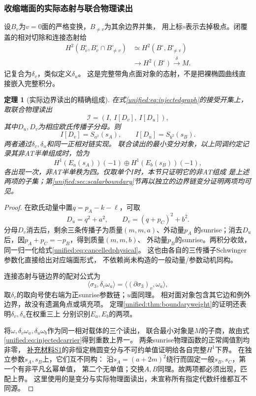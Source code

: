 \documentclass[11pt,a4paper,oneside]{ctexart}
\theoremstyle{cnplain}
\newtheorem{theorem}{定理}[section]
\theoremstyle{definition}
\theoremstyle{remark}
\numberwithin{equation}{section}
\newcommand{\otherref}[2]{\href{#1.pdf}{#2}}
\begin{document}
\subsubsection{收缩端面的实际态射与联合物理读出}
设$B_v$为$v=0$面的严格变换，$B_{\ne v}$为其余边界并集，
用上标$\circ$表示去掉极点。闭覆盖的相对切除和连接态射给
\begin{equation}\label{unified:eq:facemap}
\begin{split}
 H^2(B_v^\circ,B_v^\circ\cap B_{\ne v}^\circ)
 &\simeq H^2(B^\circ,B_{\ne v}^\circ)\\
 &\longrightarrow H^2(B^\circ)
 \overset\delta\longrightarrow M.
\end{split}
\end{equation}
记复合为$\delta_v$，类似定义$\delta_u$。
这是完整带角点面对象的态射，不是把裸椭圆曲线直接嵌入完整积分。

\begin{theorem}[实际边界读出的精确组成]\label{unified:thm:jointsector}
在式\eqref{unified:eq:injectedgraph}的接受开集上，取联合物理读出
\[
 \mathcal I=(I,\ I[D_v],\ I[D_u]),
\]
其中$D_u,D_v$为相应欧氏传播子分母。则
\begin{equation}\label{unified:eq:cancelledphysical}
 I[D_v]=S_{a^2}(s_A),\qquad I[D_u]=S_{b^2}(s_B).
\end{equation}
两者通过$\delta_v,\delta_u$和同一正相对链实现。
联合读出的最小变分对象，以上同调约定记录其非AT半单组成时，恰为
\[
 H^1(E_a(s_A))(-1)\oplus H^1(E_b(s_B))(-1),
\]
各出现一次，非AT半单秩为四。仅取单个$I$时，本节只证明它的非AT组成
是上述两项的子集；第\ref{unified:sec:scalarboundary}节再以独立的边界链变分证明两项均可见。
\end{theorem}
\begin{proof}
在欧氏动量中置$q=p_A-k-\ell$，可取
\[
 D_u=q^2+a^2,\qquad D_v=(q+p_C)^2+b^2.
\]
分母$D_v$消去后，剩余三条传播子为质量$(m,m,a)$、外动量$p_A$
的sunrise；消去$D_u$后，因$p_A+p_C=-p_B$，得到质量$(m,m,b)$、
外动量$p_B$的sunrise。两积分收敛，同一归一化给式\eqref{unified:eq:cancelledphysical}。
这也由各自的三传播子Schwinger参数化直接给出对应端面形式，
不依赖尚未构造的一般动量/参数动机同构。

连接态射与链边界的配对公式为
\[
 \langle\sigma_3,\delta_v\omega_a\rangle
   =\langle(\partial\sigma_3)_v,\omega_a\rangle,
\]
取$\delta_v$的取向号使右端为正sunrise参数链；$u$面同理。
相对面对象包含其它边和例外边界，故没有遗漏角点或填充项。
定理\ref{unified:thm:boundaryweight}的证明还表明$\delta_v,\delta_u$在权重三上
分别识别$E_a,E_b$的两项。

将$\omega,\delta_v\omega_a,\delta_u\omega_b$作为同一相对载体的三个读出，
联合最小对象是$M$的子商，故由式\eqref{unified:eq:injectedcarrier}得到重数上界一。
两条sunrise物理函数的正常阈值割均非零，
\otherref{feynman_periods_supplement}{补充材料S1}的非恒定椭圆变分与不可约单值证明给各自完整$H^1$下界。
在独立参数$s_A,s_B$上，它们互不同构：
沿$s_A=(a+2m)^2$绕行而固定一般$s_B,s_C$，第一个有非平凡幺幂单值，
第二个无单值；交换$A,B$同理。故两项都必须出现，匹配上界。
这里使用的是变分与实际物理面读出，未宣称所有指定代数纤维都互不同源。
\end{proof}
\end{document}
